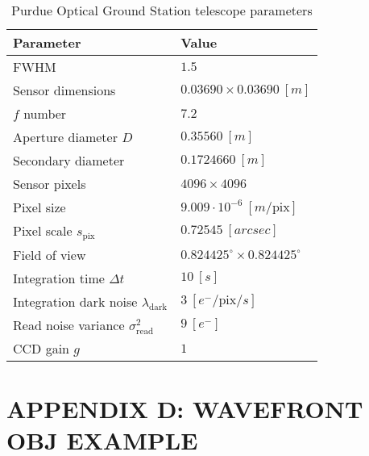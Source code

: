 \begin{table}[ht]
    \centering
    \caption{Purdue Optical Ground Station telescope parameters}
    \vspace*{6pt}
    \begin{tabular}{|l|l|}
    \hline
    \textbf{Parameter} & \textbf{Value} \\ \hline
    FWHM                & $1.5$                              \\ \hline
    Sensor dimensions    & $ 0.03690 \times 0.03690 \: [m]$                               \\ \hline
    $f$ number   & $7.2$                              \\ \hline
    Aperture diameter $D$       & $0.35560 \: [m]$                              \\ \hline
    Secondary diameter         & $0.1724660 \: [m]$                              \\ \hline
    Sensor pixels               & $4096 \times 4096$                              \\ \hline
    Pixel size               & $9.009 \cdot 10^{-6} \: [m / \textrm{pix}]$                              \\ \hline
    Pixel scale $s_\mathrm{pix}$              & $0.72545 \: [arcsec]$                              \\ \hline
    Field of view               & $0.824425^\circ \times 0.824425^\circ$                              \\ \hline
    Integration time $\Delta t$              & $10 \: [s]$                              \\ \hline
    Integration dark noise $\lambda_\mathrm{dark}$ & $3 \: \left[ e^- / \mathrm{pix} / s\right]$ \\ \hline
    Read noise variance $\sigma_\mathrm{read}^2$ & $9 \: \left[ e^- \right]$ \\ \hline
    CCD gain $g$ & $1$ \\ \hline
    \end{tabular}
    \label{tb:pogs_parameters}
  \end{table}

\clearpage
\chapter{APPENDIX D: WAVEFRONT OBJ EXAMPLE} \label{sec:obj_listing}

\begin{listing}[ht]
    \inputminted[breaklines=true, breakanywhere=true, breaksymbol=\hspace{0pt}, fontsize=\scriptsize]{text}{/Users/liamrobinson/Documents/PyLightCurves/mirage/resources/models/cube.obj}
\end{listing}
